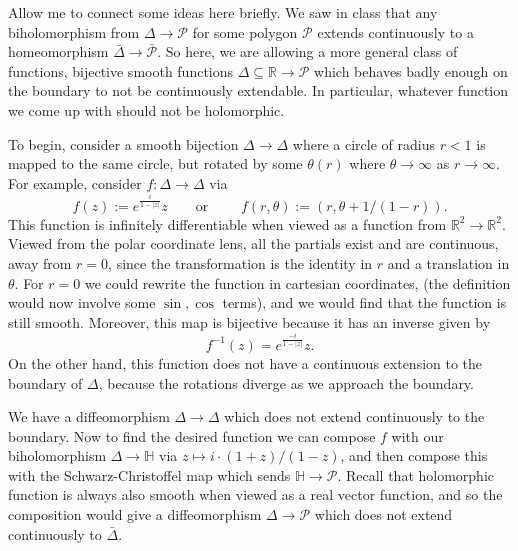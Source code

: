 \documentclass[12pt,letterpaper,boxed]{hmcpset}
\newcommand{\R}{\mathbb R}
\newcommand{\abs}[1]{\left|#1\right|}
\newcommand{\inv}{^{-1}}
\begin{document}
\begin{solution}
Allow me to connect some ideas here briefly. We saw in class that any
biholomorphism from $\Delta \to \mathcal P$ for some polygon $\mathcal
P$ extends continuously to a homeomorphism $\bar \Delta \to
\bar{\mathcal P}$. So here, we are allowing a more general class of
functions, bijective smooth functions $\Delta \subseteq \R \to
\mathcal P$ which behaves badly enough on the boundary to not be
continuously extendable. In particular, whatever function we come up
with should not be holomorphic.

To begin,
consider a smooth bijection $\Delta \to \Delta$ where a circle of
radius $r < 1$ is mapped to the same circle, but rotated by some
$\theta(r)$ where $\theta \to \infty$ as $r \to \infty$. For example,
consider $f: \Delta \to \Delta$ via
\[
	f(z) := e^{\frac{i}{1-\abs{z}}} z \qquad \text{or } \qquad
	f(r,\theta) := (r, \theta + 1/(1-r)). 
\]
This function is infinitely differentiable when viewed as a function
from $\R^2 \to \R^2$. Viewed from the polar coordinate lens, all the
partials exist and are continuous, away from $r = 0$, since the
transformation is the identity in $r$ and a translation in $\theta$. 
For $r =0$ we could rewrite the function in cartesian coordinates,
(the definition would now involve some $\sin,\cos$ terms), 
and we would find that the function is still smooth. 
Moreover, this map is bijective because it has an inverse given by 
\[
	f\inv(z) = e^{\frac{-i}{1-\abs{z}}} z.
\]
On the other hand, this function does not have a continuous extension
to the boundary of $\Delta$, because the rotations diverge as we
approach the boundary.

We have a diffeomorphism $\Delta \to \Delta$ which does not extend
continuously to the boundary. Now to find the desired function we can
compose $f$ with our biholomorphism $\Delta \to \mathbb H$ via $z
\mapsto i \cdot (1+z)/(1-z)$, and then
compose this with the Schwarz-Christoffel map which sends $\mathbb H
\to \mathcal P$. Recall that holomorphic function is
always also smooth when viewed as a real vector function, and so the
composition would give a diffeomorphism $\Delta \to \mathcal P$ which
does not extend continuously to $\bar \Delta$. 

\end{solution}

\newpage
\end{document}
